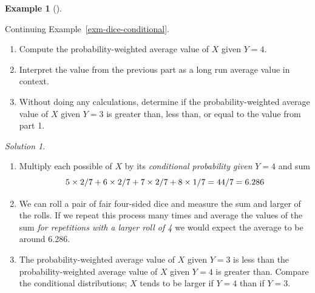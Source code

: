 \documentclass[
  letterpaper,
  DIV=11,
  numbers=noendperiod]{scrreprt}
\providecommand{\tightlist}{%
  \setlength{\itemsep}{0pt}\setlength{\parskip}{0pt}}
\theoremstyle{plain}
\theoremstyle{definition}
\newtheorem{example}{Example}[chapter]
\theoremstyle{definition}
\theoremstyle{definition}
\theoremstyle{remark}
\newtheorem{refsolution}{Solution}[chapter]
\begin{document}
\begin{tcolorbox}[enhanced jigsaw, opacityback=0, left=2mm, colframe=quarto-callout-note-color-frame, toprule=.15mm, breakable, colback=white, leftrule=.75mm, arc=.35mm, rightrule=.15mm, bottomrule=.15mm]

\begin{example}[]\protect\hypertarget{exm-dice-conditional-ev}{}\label{exm-dice-conditional-ev}

Continuing Example~\ref{exm-dice-conditional}.

\begin{enumerate}
\def\labelenumi{\arabic{enumi}.}
\tightlist
\item
  Compute the probability-weighted average value of \(X\) given \(Y=4\).
\item
  Interpret the value from the previous part as a long run average value
  in context.
\item
  Without doing any calculations, determine if the probability-weighted
  average value of \(X\) given \(Y=3\) is greater than, less than, or
  equal to the value from part 1.
\end{enumerate}

\end{example}

\end{tcolorbox}

\begin{tcolorbox}[enhanced jigsaw, opacityback=0, rightrule=.15mm, coltitle=black, colframe=quarto-callout-tip-color-frame, toprule=.15mm, colbacktitle=quarto-callout-tip-color!10!white, opacitybacktitle=0.6, left=2mm, toptitle=1mm, breakable, title={Solution (click to expand)}, bottomtitle=1mm, colback=white, leftrule=.75mm, titlerule=0mm, arc=.35mm, bottomrule=.15mm]

\begin{refsolution}
\leavevmode

\begin{enumerate}
\def\labelenumi{\arabic{enumi}.}
\tightlist
\item
  Multiply each possible of \(X\) by its \emph{conditional probability
  given} \(Y=4\) and sum \[
  \small{
  5 \times 2/7 + 6 \times 2/7 + 7 \times 2/7 + 8 \times 1/7 = 44/7 = 6.286
  }
  \]
\item
  We can roll a pair of fair four-sided dice and measure the sum and
  larger of the rolls. If we repeat this process many times and average
  the values of the sum \emph{for repetitions with a larger roll of 4}
  we would expect the average to be around 6.286.
\item
  The probability-weighted average value of \(X\) given \(Y=3\) is less
  than the probability-weighted average value of \(X\) given \(Y=4\) is
  greater than. Compare the conditional distributions; \(X\) tends to be
  larger if \(Y=4\) than if \(Y=3\).
\end{enumerate}

\label{sol-dice-conditional-ev}

\end{refsolution}

\end{tcolorbox}
\end{document}
